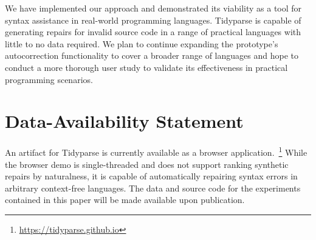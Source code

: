 \documentclass[sigplan,review,acmsmall,nonacm,anonymous]{acmart}\settopmatter{printfolios=false,printccs=false,printacmref=false}
\begin{document}

  We have implemented our approach and demonstrated its viability as a tool for syntax assistance in real-world programming languages. Tidyparse is capable of generating repairs for invalid source code in a range of practical languages with little to no data required. We plan to continue expanding the prototype's autocorrection functionality to cover a broader range of languages and hope to conduct a more thorough user study to validate its effectiveness in practical programming scenarios.

  \section*{Data-Availability Statement}

  An artifact for Tidyparse is currently available as a browser application.~\footnote{\url{https://tidyparse.github.io}} While the browser demo is single-threaded and does not support ranking synthetic repairs by naturalness, it is capable of automatically repairing syntax errors in arbitrary context-free languages. The data and source code for the experiments contained in this paper will be made available upon publication.

%

%
\end{document}
